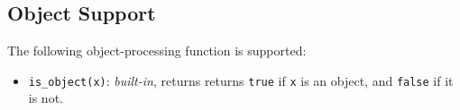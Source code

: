 \subsection*{Object Support}

The following object-processing function is supported:

\begin{itemize}
\item \lstinline{is_object(x)}: \textit{built-in}, returns
  returns \texttt{true} if \texttt{x} is an object, and \texttt{false} if it is not.
\end{itemize}

  


